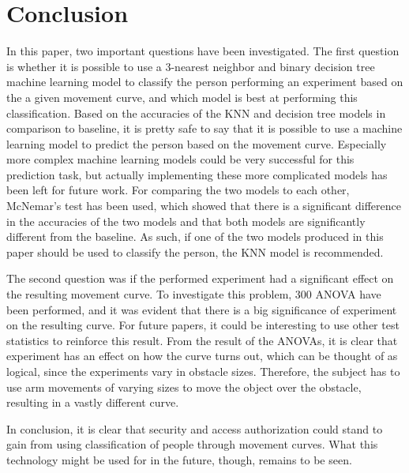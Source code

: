 \documentclass[11pt, fleqn, titlepage]{article}
\begin{document}
\section{Conclusion} \vspace*{-0.1cm}
In this paper, two important questions have been investigated. The first question is whether it is possible to use a 3-nearest neighbor and binary decision tree machine learning model to classify the person performing an experiment based on the a given movement curve, and which model is best at performing this classification. Based on the accuracies of the KNN and decision tree models in comparison to baseline, it is pretty safe to say that it is possible to use a machine learning model to predict the person based on the movement curve. Especially more complex machine learning models could be very successful for this prediction task, but actually implementing these more complicated models has been left for future work. For comparing the two models to each other, McNemar's test has been used, which showed that there is a significant difference in the accuracies of the two models and that both models are significantly different from the baseline. As such, if one of the two models produced in this paper should be used to classify the person, the KNN model is recommended.

The second question was if the performed experiment had a significant effect on the resulting movement curve. To investigate this problem, 300 ANOVA have been performed, and it was evident that there is a big significance of experiment on the resulting curve. For future papers, it could be interesting to use other test statistics to reinforce this result. From the result of the ANOVAs, it is clear that experiment has an effect on how the curve turns out, which can be thought of as logical, since the experiments vary in obstacle sizes. Therefore, the subject has to use arm movements of varying sizes to move the object over the obstacle, resulting in a vastly different curve.

In conclusion, it is clear that security and access authorization could stand to gain from using classification of people through movement curves. What this technology might be used for in the future, though, remains to be seen.
\newpage
\end{document}
